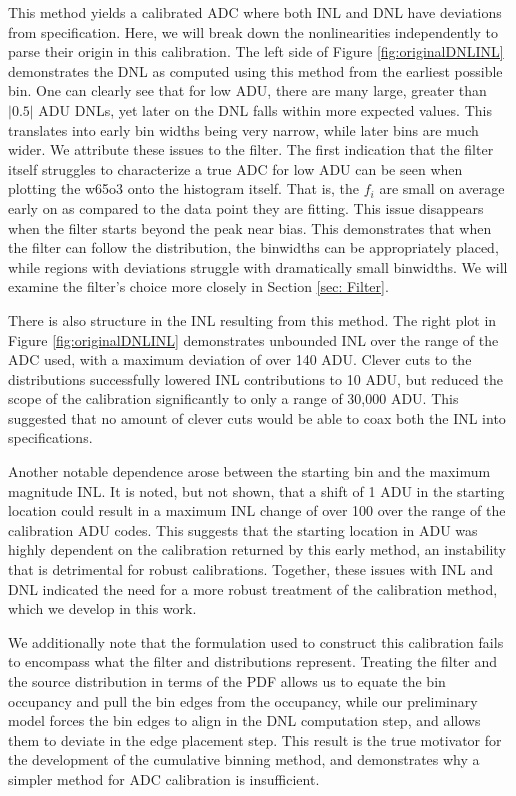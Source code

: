 \documentclass[linenumbers]{aastex7}
\begin{document}
This method yields a calibrated ADC where both INL and DNL have deviations from specification. 
Here, we will break down the nonlinearities independently to parse their origin in this calibration. 
The left side of Figure \ref{fig:originalDNLINL} demonstrates the DNL as computed using this method from the earliest possible bin. 
One can clearly see that for low ADU, there are many large, greater than $|0.5|$ ADU DNLs, yet later on the DNL falls within more expected values. 
This translates into early bin widths being very narrow, while later bins are much wider. 
We attribute these issues to the filter. 
The first indication that the filter itself struggles to characterize a true ADC for low ADU can be seen when plotting the w65o3 onto the histogram itself. 
That is, the $f_{i}$ are small on average early on as compared to the data point they are fitting.
This issue disappears when the filter starts beyond the peak near bias. 
This demonstrates that when the filter can follow the distribution, the binwidths can be appropriately placed, while regions with deviations struggle with dramatically small binwidths. 
We will examine the filter’s choice more closely in Section \ref{sec: Filter}.

There is also structure in the INL resulting from this method.
The right plot in Figure \ref{fig:originalDNLINL} demonstrates unbounded INL over the range of the ADC used, with a maximum deviation of over 140 ADU. 
Clever cuts to the distributions successfully lowered INL contributions to 10 ADU, but reduced the scope of the calibration significantly to only a range of 30,000 ADU. 
This suggested that no amount of clever cuts would be able to coax both the INL into specifications. 

Another notable dependence arose between the starting bin and the maximum magnitude INL. 
It is noted, but not shown, that a shift of 1 ADU in the starting location could result in a maximum INL change of over 100 over the range of the calibration ADU codes. 
This suggests that the starting location in ADU was highly dependent on the calibration returned by this early method, an instability that is detrimental for robust calibrations. 
Together, these issues with INL and DNL indicated the need for a more robust treatment of the calibration method, which we develop in this work. 

We additionally note that the formulation used to construct this calibration fails to encompass what the filter and distributions represent. 
Treating the filter and the source distribution in terms of the PDF allows us to equate the bin occupancy and pull the bin edges from the occupancy, while our preliminary model forces the bin edges to align in the DNL computation step, and allows them to deviate in the edge placement step. 
This result is the true motivator for the development of the cumulative binning method, and demonstrates why a simpler method for ADC calibration is insufficient. 
\end{document}
